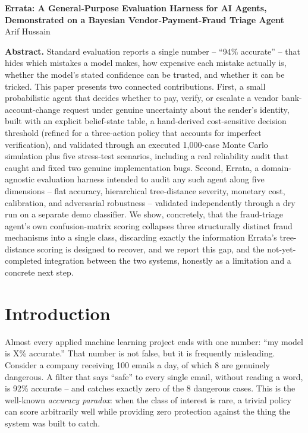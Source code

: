 \documentclass[10pt]{article}
\begin{document}
\begin{center}
{\large \textbf{Errata: A General-Purpose Evaluation Harness for AI Agents,
Demonstrated on a Bayesian Vendor-Payment-Fraud Triage Agent}}\\[8pt]
{Arif Hussain}\\[10pt]
\end{center}

\noindent\textbf{Abstract.}
    Standard evaluation reports a single number -- ``94\% accurate'' --
    that hides which mistakes a model makes, how expensive each mistake
    actually is, whether the model's stated confidence can be trusted,
    and whether it can be tricked. This paper presents two connected
    contributions. First, a small probabilistic agent that decides
    whether to pay, verify, or escalate a vendor bank-account-change
    request under genuine uncertainty about the sender's identity,
    built with an explicit belief-state table, a hand-derived
    cost-sensitive decision threshold (refined for a three-action
    policy that accounts for imperfect verification), and validated
    through an executed 1{,}000-case Monte Carlo simulation plus five
    stress-test scenarios, including a real reliability audit that
    caught and fixed two genuine implementation bugs. Second, Errata,
    a domain-agnostic evaluation harness intended to audit any such
    agent along five dimensions -- flat accuracy, hierarchical
    tree-distance severity, monetary cost, calibration, and adversarial
    robustness -- validated independently through a dry run on a
    separate demo classifier. We show, concretely, that the
    fraud-triage agent's own confusion-matrix scoring collapses three
    structurally distinct fraud mechanisms into a single class,
    discarding exactly the information Errata's tree-distance scoring
    is designed to recover, and we report this gap, and the
    not-yet-completed integration between the two systems, honestly as
    a limitation and a concrete next step.

\bigskip

\section{Introduction}

Almost every applied machine learning project ends with one number:
``my model is X\% accurate.'' That number is not false, but it is
frequently misleading. Consider a company receiving 100 emails a day,
of which 8 are genuinely dangerous. A filter that says ``safe'' to
every single email, without reading a word, is 92\% accurate --
and catches exactly zero of the 8 dangerous cases. This is the
well-known \emph{accuracy paradox}: when the class of interest is rare,
a trivial policy can score arbitrarily well while providing zero
protection against the thing the system was built to catch.
\end{document}
